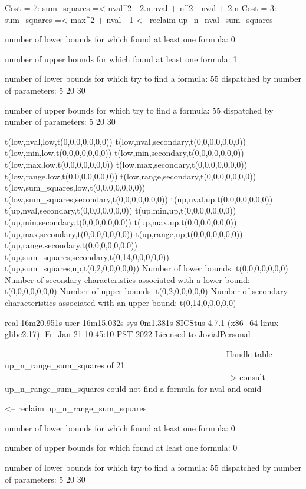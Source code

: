 Cost =  7:  sum_squares =< nval^2 - 2.n.nval + n^2 - nval + 2.n
Cost =  3:  sum_squares =< max^2 + nval - 1
<-- reclaim up_n_nval_sum_squares

number of lower bounds for which found at least one formula: 0

number of upper bounds for which found at least one formula: 1

number of lower bounds for which try to find a formula: 55
dispatched by number of parameters: 5  20  30

number of upper bounds for which try to find a formula: 55
dispatched by number of parameters: 5  20  30

t(low,nval,low,t(0,0,0,0,0,0,0))
t(low,nval,secondary,t(0,0,0,0,0,0,0))
t(low,min,low,t(0,0,0,0,0,0,0))
t(low,min,secondary,t(0,0,0,0,0,0,0))
t(low,max,low,t(0,0,0,0,0,0,0))
t(low,max,secondary,t(0,0,0,0,0,0,0))
t(low,range,low,t(0,0,0,0,0,0,0))
t(low,range,secondary,t(0,0,0,0,0,0,0))
t(low,sum_squares,low,t(0,0,0,0,0,0,0))
t(low,sum_squares,secondary,t(0,0,0,0,0,0,0))
t(up,nval,up,t(0,0,0,0,0,0,0))
t(up,nval,secondary,t(0,0,0,0,0,0,0))
t(up,min,up,t(0,0,0,0,0,0,0))
t(up,min,secondary,t(0,0,0,0,0,0,0))
t(up,max,up,t(0,0,0,0,0,0,0))
t(up,max,secondary,t(0,0,0,0,0,0,0))
t(up,range,up,t(0,0,0,0,0,0,0))
t(up,range,secondary,t(0,0,0,0,0,0,0))
t(up,sum_squares,secondary,t(0,14,0,0,0,0,0))
t(up,sum_squares,up,t(0,2,0,0,0,0,0))
Number of lower bounds:                                             t(0,0,0,0,0,0,0)
Number of secondary characteristics associated with a lower bound:  t(0,0,0,0,0,0,0)
Number of upper bounds:                                             t(0,2,0,0,0,0,0)
Number of secondary characteristics associated with an upper bound: t(0,14,0,0,0,0,0)

real	16m20.951s
user	16m15.032s
sys	0m1.381s
SICStus 4.7.1 (x86_64-linux-glibc2.17): Fri Jan 21 10:45:10 PST 2022
Licensed to JovialPersonal


--------------------------------------------------------------------------------
Handle table up_n_range_sum_squares of 21
--------------------------------------------------------------------------------
--> consult up_n_range_sum_squares
could not find a formula for nval and omid

<-- reclaim up_n_range_sum_squares

number of lower bounds for which found at least one formula: 0

number of upper bounds for which found at least one formula: 0

number of lower bounds for which try to find a formula: 55
dispatched by number of parameters: 5  20  30

